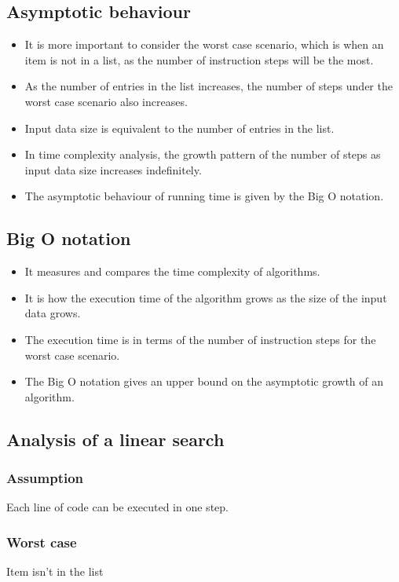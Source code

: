 \documentclass[11pt]{article}
\begin{document}
\subsection{Asymptotic behaviour}
\label{sec:org8f1aee1}
\begin{itemize}
\item It is more important to consider the worst case scenario, which is when an item is not in a list, as the number of instruction steps will be the most.
\item As the number of entries in the list increases, the number of steps under the worst case scenario also increases.
\item Input data size is equivalent to the number of entries in the list.
\item In time complexity analysis, the growth pattern of the number of steps as input data size increases indefinitely.
\item The asymptotic behaviour of running time is given by the Big O notation.
\end{itemize}

\subsection{Big O notation}
\label{sec:org80a3389}
\begin{itemize}
\item It measures and compares the time complexity of algorithms.
\item It is how the execution time of the algorithm grows as the size of the input data grows.
\item The execution time is in terms of the number of instruction steps for the worst case scenario.
\item The Big O notation gives an upper bound on the asymptotic growth of an algorithm.
\end{itemize}

\subsection{Analysis of a linear search}
\label{sec:org8ae5e40}

\subsubsection{Assumption}
\label{sec:orgce78419}
Each line of code can be executed in one step.

\subsubsection{Worst case}
\label{sec:org12b82be}
Item isn't in the list
\end{document}
